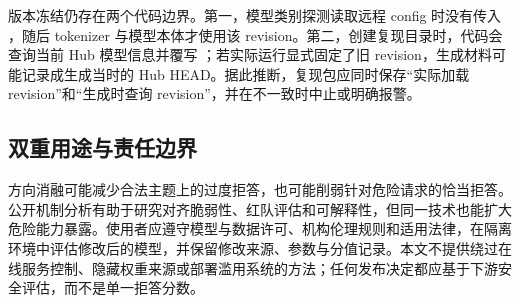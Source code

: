 版本冻结仍存在两个代码边界。第一，模型类别探测读取远程 config 时没有传入 ，随后 tokenizer 与模型本体才使用该 revision。第二，创建复现目录时，代码会查询当前 Hub 模型信息并覆写 ；若实际运行显式固定了旧 revision，生成材料可能记录成生成当时的 Hub HEAD。据此推断，复现包应同时保存“实际加载 revision”和“生成时查询 revision”，并在不一致时中止或明确报警。

\subsection{双重用途与责任边界}

方向消融可能减少合法主题上的过度拒答，也可能削弱针对危险请求的恰当拒答。公开机制分析有助于研究对齐脆弱性、红队评估和可解释性，但同一技术也能扩大危险能力暴露。使用者应遵守模型与数据许可、机构伦理规则和适用法律，在隔离环境中评估修改后的模型，并保留修改来源、参数与分值记录。本文不提供绕过在线服务控制、隐藏权重来源或部署滥用系统的方法；任何发布决定都应基于下游安全评估，而不是单一拒答分数。
